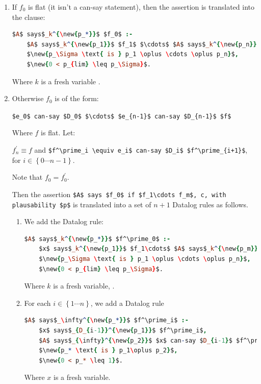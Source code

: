 \documentclass[thesis.tex]{subfiles}
\begin{document}
\begin{enumerate}
\item 
  If $f_0$ is flat (it isn't a can-say statement), then the assertion is translated into the clause:
  \begin{lstlisting}[language=Prolog]
$A$ says$_k^{\new{p_*}}$ $f_0$ :- 
    $A$ says$_k^{\new{p_1}}$ $f_1$ $\cdots$ $A$ says$_k^{\new{p_n}}$ $f_n$, c, 
    $\new{p_\Sigma \text{ is } p_1 \oplus \cdots \oplus p_n}$, 
    $\new{0 < p_{lim} \leq p_\Sigma}$.
  \end{lstlisting}
  Where $k$ is a fresh variable .
  
\item 
  Otherwise $f_0$ is of the form:

  \lstinline!$e_0$ can-say $D_0$ $\cdots$ $e_{n-1}$ can-say $D_{n-1}$ $f$!

  Where $f$ is flat. Let:

  $f^\prime_n \equiv f$ and \lstinline!$f^\prime_i \equiv e_i$ can-say $D_i$ $f^\prime_{i+1}$!, for $i\in\left\{0\cdots n-1\right\}$.

  Note that $f_0 = f^\prime_0$.  

  Then the assertion \lstinline!$A$ says $f_0$ if $f_1\cdots f_m$, c, with plausability $p$! is translated into a set of $n+1$ Datalog rules as follows.
  
  \begin{enumerate}
  \item 
    We add the Datalog rule:
    \begin{lstlisting}[language=Prolog]
$A$ says$_k^{\new{p_*}}$ $f^\prime_0$ :-
    $x$ says$_k^{\new{p_1}}$ $f_1\cdots$ $A$ says$_k^{\new{p_m}}$ $f_m$, c,
    $\new{p_\Sigma \text{ is } p_1 \oplus \cdots \oplus p_n}$, 
    $\new{0 < p_{lim} \leq p_\Sigma}$.
    \end{lstlisting}
    Where $k$ is a fresh variable, .

  \item
    For each $i\in\left\{1\cdots n\right\}$, we add a Datalog rule
    \begin{lstlisting}[language=Prolog]
$A$ says$_\infty^{\new{p_*}}$ $f^\prime_i$ :-
    $x$ says$_{D_{i-1}}^{\new{p_1}}$ $f^\prime_i$,
    $A$ says$_{\infty}^{\new{p_2}}$ $x$ can-say $D_{i-1}$ $f^\prime_i$,
    $\new{p_* \text{ is } p_1\oplus p_2}$, 
    $\new{0 < p_* \leq 1}$.
    \end{lstlisting}
    Where $x$ is a fresh variable.
  \end{enumerate}
  

\end{enumerate}
\end{document}
